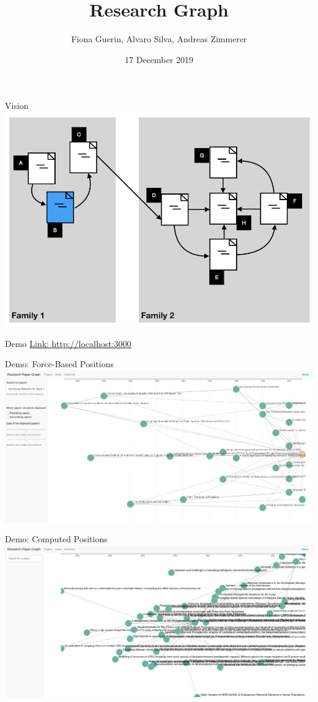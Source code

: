 \documentclass{beamer}
\title[Research Graph]{Research Graph}
\author[Guerin, Silva, Zimmerer]{Fiona Guerin, Alvaro Silva, Andreas Zimmerer}
\institute{Technical University of Munich}
\date{17 December 2019}
\begin{document}
\maketitle

\begin{frame}{Vision}
    \includegraphics{img_02.png}
\end{frame}

\begin{frame}{Demo}
\url{Link: http://localhost:3000}
\end{frame}

\begin{frame}{Demo: Force-Based Positions}
    \includegraphics{graph_random_positions.png}
\end{frame}

\begin{frame}{Demo: Computed Positions}
    \includegraphics{graph_computed_positions.png}
\end{frame}
\end{document}
